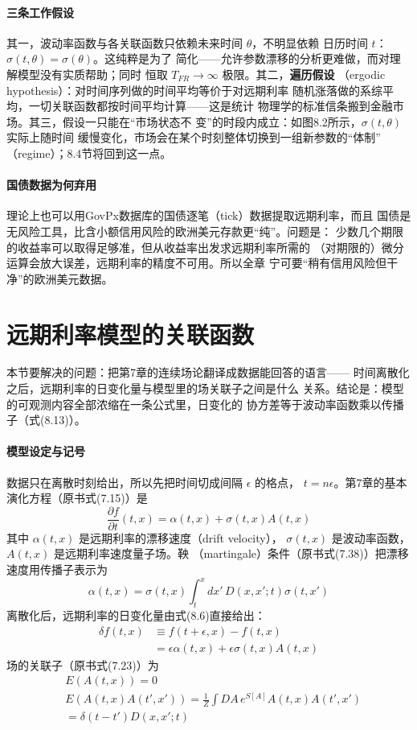 \paragraph{三条工作假设}
其一，波动率函数与各关联函数只依赖未来时间 $\theta$，不明显依赖
日历时间 $t$：$\sigma(t,\theta)=\sigma(\theta)$。这纯粹是为了
简化——允许参数漂移的分析更难做，而对理解模型没有实质帮助；同时
恒取 $T_{FR}\to\infty$ 极限。其二，\textbf{遍历假设}
（ergodic hypothesis）：对时间序列做的时间平均等价于对远期利率
随机涨落做的系综平均，一切关联函数都按时间平均计算——这是统计
物理学的标准信条搬到金融市场。其三，假设一只能在“市场状态不
变”的时段内成立：如图8.2所示，$\sigma(t,\theta)$ 实际上随时间
缓慢变化，市场会在某个时刻整体切换到一组新参数的“体制”
（regime）；8.4节将回到这一点。

\paragraph{国债数据为何弃用}
理论上也可以用GovPx数据库的国债逐笔（tick）数据提取远期利率，而且
国债是无风险工具，比含小额信用风险的欧洲美元存款更“纯”。问题是：
少数几个期限的收益率可以取得足够准，但从收益率出发求远期利率所需的
（对期限的）微分运算会放大误差，远期利率的精度不可用。所以全章
宁可要“稍有信用风险但干净”的欧洲美元数据。

\section{远期利率模型的关联函数}

本节要解决的问题：把第7章的连续场论翻译成数据能回答的语言——
时间离散化之后，远期利率的日变化量与模型里的场关联子之间是什么
关系。结论是：模型的可观测内容全部浓缩在一条公式里，日变化的
协方差等于波动率函数乘以传播子（式(8.13)）。

\paragraph{模型设定与记号}
数据只在离散时刻给出，所以先把时间切成间隔 $\epsilon$ 的格点，
$t=n\epsilon$。第7章的基本演化方程（原书式(7.15)）是
\begin{equation*}
\frac{\partial f}{\partial t}(t,x)=\alpha(t,x)+\sigma(t,x)A(t,x)
\tag{8.6}
\end{equation*}
其中 $\alpha(t,x)$ 是远期利率的漂移速度（drift velocity），
$\sigma(t,x)$ 是波动率函数，$A(t,x)$ 是远期利率速度量子场。鞅
（martingale）条件（原书式(7.38)）把漂移速度用传播子表示为
\begin{equation*}
\alpha(t,x)=\sigma(t,x)\int_{t}^{x}dx'\,D(x,x';t)\sigma(t,x')
\tag{8.7}
\end{equation*}
离散化后，远期利率的日变化量由式(8.6)直接给出：
\begin{align*}
\delta f(t,x)&\equiv f(t+\epsilon,x)-f(t,x)\\
&=\epsilon\alpha(t,x)+\epsilon\sigma(t,x)A(t,x)
\tag{8.8}
\end{align*}
场的关联子（原书式(7.23)）为
\begin{align*}
&E(A(t,x))=0
\tag{8.9}\\
&E(A(t,x)A(t',x'))=\frac{1}{Z}\int DA\,e^{S[A]}A(t,x)A(t',x')
\tag{8.10}\\
&=\delta(t-t')D(x,x';t)
\tag{8.11}
\end{align*}

